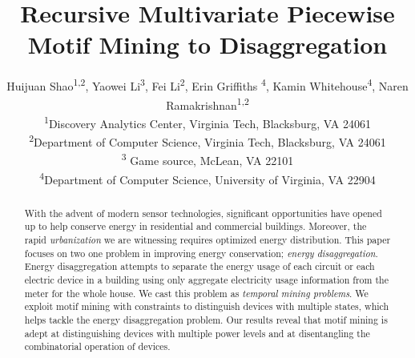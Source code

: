 \documentclass[sigconf]{acmart}
\begin{document}
\title{Recursive Multivariate Piecewise Motif Mining to Disaggregation}

\author{
  Huijuan Shao\textsuperscript{1,2}, Yaowei Li\textsuperscript{3}, Fei Li\textsuperscript{2}, Erin Griffiths \textsuperscript{4}, Kamin Whitehouse\textsuperscript{4}, Naren Ramakrishnan\textsuperscript{1,2} \\
  \textsuperscript{1}Discovery Analytics Center, Virginia Tech, Blacksburg, VA 24061 \\ %
  \textsuperscript{2}Department of Computer Science, Virginia Tech, Blacksburg, VA 24061 \\ %
    \textsuperscript{3} Game source, McLean, VA 22101 \\
  \textsuperscript{4}Department of Computer Science, University of Virginia, VA 22904 \\ %
}




\renewcommand{\shortauthors}{H. Shao et al.}


\begin{abstract}
With the advent of modern sensor technologies, 
significant opportunities have opened up to help conserve energy in 
residential and commercial buildings. Moreover, the rapid \emph{urbanization} we are witnessing requires optimized energy distribution. 
This paper focuses on two one problem in improving energy conservation; \emph{energy disaggregation}. 
Energy disaggregation attempts to 
separate the energy usage 
of each circuit or each electric device in a building 
using only aggregate electricity usage information from 
the meter for the whole house. 
We cast this problem as \emph{temporal mining problems}. We exploit motif mining with constraints to distinguish devices with multiple states, which helps tackle the energy disaggregation problem. Our
results reveal that motif mining is adept at distinguishing
devices with multiple power levels and at disentangling the
combinatorial operation of devices.
\end{abstract}

%
%
\end{document}
